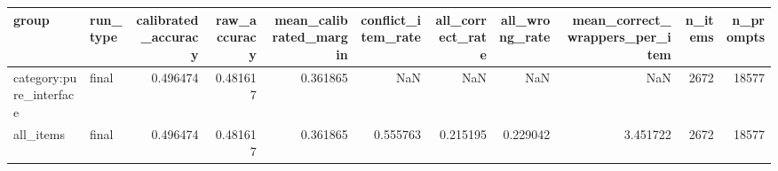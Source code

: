 \begin{tabular}{llrrrrrrrrr}
\toprule
group & run\_type & calibrated\_accuracy & raw\_accuracy & mean\_calibrated\_margin & conflict\_item\_rate & all\_correct\_rate & all\_wrong\_rate & mean\_correct\_wrappers\_per\_item & n\_items & n\_prompts \\
\midrule
category:pure\_interface & final & 0.496474 & 0.481617 & 0.361865 & NaN & NaN & NaN & NaN & 2672 & 18577 \\
all\_items & final & 0.496474 & 0.481617 & 0.361865 & 0.555763 & 0.215195 & 0.229042 & 3.451722 & 2672 & 18577 \\
\bottomrule
\end{tabular}

